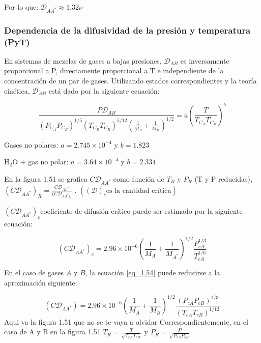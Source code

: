 Por lo que: $\mathscr{D}_{AA^*} \approx 1.32 \nu$
\subsubsection{Dependencia de la difusividad de la presión y temperatura (PyT)}
En sistemas de mezclas de gases a bajas presiones,  $\mathscr{D}_{AB}$ es inversamente proporcional a P, directamente proporcional a T e independiente de la concentración de un par de gases.
Utilizando estados correspondientes y la teoría cinética, \( \mathscr{D}_{AB} \) está dado por la siguiente ecuación:

\begin{equation}
\frac{P \mathscr{D}_{AB}}{(P_{C_A} P_{C_{B}})^{1/5} (T_{{C_B}} T_{C_{B}})^{5/12} \left( \frac{1}{M_A} + \frac{1}{M_B} \right)^{1/2}} = a \left( \frac{T}{T_{C_A} T_{C_B}} \right)^b\tag{1.53}\label{eq_1.53}
\end{equation}

Gases no polares: \( a = 2.745 \times 10^{-4} \) y \( b = 1.823 \)  

H$_2$O + gas no polar: \( a = 3.64 \times 10^{-4} \) y \( b = 2.334 \)

En la figura 1.51 se grafica \( C \mathscr{D}_{AA^*}\) como función de \( T_R \) y \( P_R \) (T y P reducidas), \( (C \mathscr{D}_{AA^*})_R=\frac{C\mathscr{D}_{AA^*}}{(C\mathscr{D}_{AA^*)_c}} \) .
$((\mathscr{D})_c \text{es la cantidad crítica})$

$(C\mathscr{D}_{AA^*})_c$coeficiente de difusión crítico puede ser estimado por la siguiente ecuación:

\begin{equation}
(C\mathscr{D}_{AA^*})_c = 2.96 \times 10^{-6} \left( \frac{1}{M_A} + \frac{1}{M_{A^*}} \right)^{1/2} \frac{P_{cA}^{1/3}}{T_{cA}^{1/6}}\tag{1.54}\label{eq_1.54}
\end{equation}

En el caso de gases \( A \) y \( B \), la ecuación \ref{eq_1.54} puede reducirse a la aproximación siguiente:

\begin{equation}
(C \mathscr{D}_{AA^*}) = 2.96 \times 10^{-6} \left( \frac{1}{M_A} + \frac{1}{M_B} \right)^{1/2}  \frac{(P_{cA} P_{cB})^{1/3}}{(T_{cA} T_{cB})^{1/12}} \tag{1.55}\label{eq_1.55}
\end{equation}
Aqui va la figura 1.51 que no se te vaya a olvidar
Correspondientemente, en el caso de A y B en la figura 1.51
$T_R=\frac{T}{\sqrt{T_{cA}T_{cB}}}$ y $P_R=\frac{P}{\sqrt{P_{cA}P_{cB}}}$


